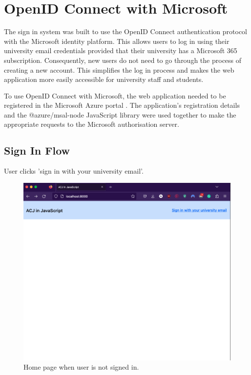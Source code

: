 \documentclass{l4proj}
\begin{document}
\section{OpenID Connect with Microsoft}

The sign in system was built to use the OpenID Connect authentication protocol with the Microsoft identity platform. This allows users to log in using their university email credentials provided that their university has a Microsoft 365 subscription. Consequently, new users do not need to go through the process of creating a new account. This simplifies the log in process and makes the web application more easily accessible for university staff and students.

To use OpenID Connect with Microsoft, the web application needed to be registered in the Microsoft Azure portal \citep{openid:node}. The application's registration details and the @azure/msal-node JavaScript library were used together to make the appropriate requests to the Microsoft authorisation server.

\subsection{Sign In Flow}

User clicks 'sign in with your university email'.

\begin{figure}[h]
\begin{center}
    \includegraphics[width=0.75\linewidth]{images/home-before.png} 
    \caption{Home page when user is not signed in.}
\end{center}
\end{figure}
\end{document}
